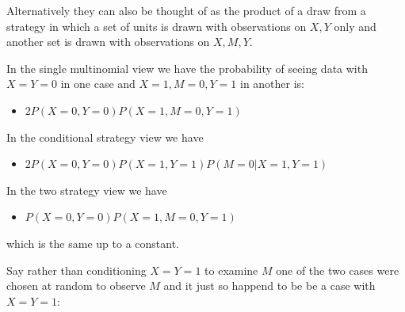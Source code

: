 \documentclass[12pt,]{book}
\providecommand{\tightlist}{%
  \setlength{\itemsep}{0pt}\setlength{\parskip}{0pt}}
\begin{document}
Alternatively they can also be thought of as the product of a draw from a strategy in which a set of units is drawn with observations on \(X,Y\) only and another set is drawn with observations on \(X, M,Y\).

In the single multinomial view we have the probability of seeing data with \(X=Y=0\) in one case and \(X=1, M=0, Y=1\) in another is:

\begin{itemize}
\tightlist
\item
  \(2P(X=0, Y=0)P(X=1, M=0, Y=1)\)
\end{itemize}

In the conditional strategy view we have

\begin{itemize}
\tightlist
\item
  \(2P(X=0, Y=0)P(X=1, Y=1)P(M=0 | X=1, Y=1)\)
\end{itemize}

In the two strategy view we have

\begin{itemize}
\tightlist
\item
  \(P(X=0, Y=0)P(X=1, M=0, Y=1)\)
\end{itemize}

which is the same up to a constant.

Say rather than conditioning \(X=Y=1\) to examine \(M\) one of the two cases were chosen at random to observe \(M\) and it just so happend to be be a case with \(X=Y=1\):
\end{document}
